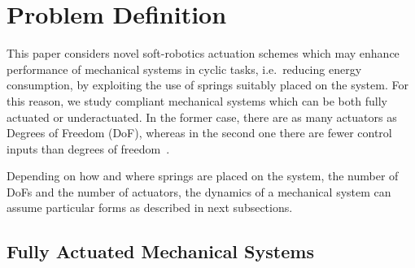 \section{Problem Definition}

This paper considers novel soft-robotics actuation schemes which may enhance performance of mechanical systems in cyclic tasks, i.e.~reducing energy consumption, by exploiting the use of springs suitably placed on the system. For this reason, we study compliant mechanical systems which can be both fully actuated or underactuated. In the former case, there are as many actuators as Degrees of Freedom (DoF), whereas in the second one there are fewer control inputs than degrees of freedom~\cite{spong98}. 

Depending on how and where springs are placed on the system, the number of DoFs and the number of actuators, the dynamics of a mechanical system can assume particular forms as described in next subsections.

% 

\subsection{Fully Actuated Mechanical Systems}
\label{sec:FullyActuatedSystems}

